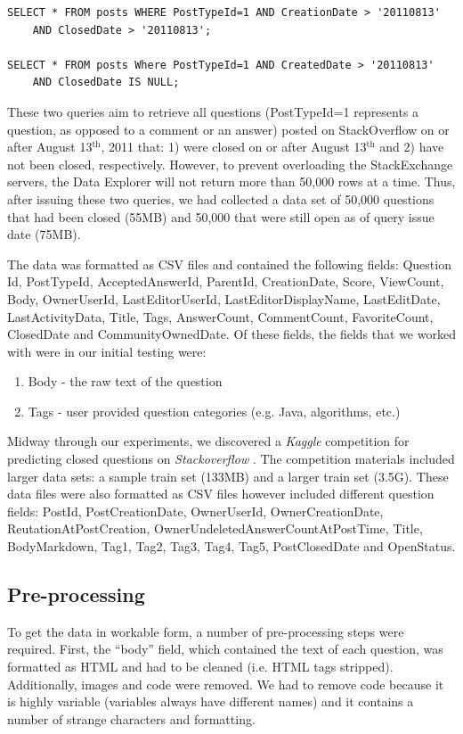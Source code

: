 \documentclass[11pt]{article}
\begin{document}
\begin{verbatim}
SELECT * FROM posts WHERE PostTypeId=1 AND CreationDate > '20110813'
    AND ClosedDate > '20110813';

SELECT * FROM posts Where PostTypeId=1 AND CreatedDate > '20110813'
    AND ClosedDate IS NULL;
\end{verbatim}

These two queries aim to retrieve all questions (PostTypeId=1 represents a question, as opposed to a comment or an answer) posted on StackOverflow on or after August 13$^{\textrm{th}}$, 2011 that: 1)
were closed on or after August 13$^{\textrm{th}}$ and 2) have not been
closed, respectively.  However, to prevent overloading the StackExchange servers, the Data
Explorer will not return more than 50,000 rows at a time.  Thus, after
issuing these two queries, we had collected a data set of 50,000
questions that had been closed (55MB) and 50,000 that were still open as of
query issue date (75MB).

The data was formatted as CSV files and contained the following
fields: Question Id, PostTypeId, AcceptedAnswerId, ParentId,
CreationDate, Score, ViewCount, Body, OwnerUserId, LastEditorUserId,
LastEditorDisplayName, LastEditDate, LastActivityData, Title, Tags,
AnswerCount, CommentCount, FavoriteCount, ClosedDate and
CommunityOwnedDate. Of these fields, the fields that we worked with
were in our initial testing were:

\begin{enumerate}
  \item Body - the raw text of the question
  \item Tags - user provided question categories (e.g. Java,
    algorithms, etc.)
\end{enumerate}

Midway through our experiments, we discovered a \emph{Kaggle}
competition for predicting closed questions on \emph{Stackoverflow}
\cite{website:kaggle}. The competition materials included larger data sets: a
sample train set (133MB) and a larger train set (3.5G).  These data
files were also formatted as CSV files however included different
question fields: PostId, PostCreationDate, OwnerUserId,
OwnerCreationDate, ReutationAtPostCreation,
OwnerUndeletedAnswerCountAtPostTime, Title, BodyMarkdown, Tag1, Tag2,
Tag3, Tag4, Tag5, PostClosedDate and OpenStatus.

\subsection{Pre-processing}
To get the data in workable form, a number of pre-processing steps
were required. First, the ``body'' field, which contained the text of
each question, was formatted as HTML and had to be
cleaned (i.e. HTML tags stripped). Additionally, images and code were
removed.  We had to remove code because it is highly variable
(variables always have different names) and it contains a number of
strange characters and formatting.
\end{document}
